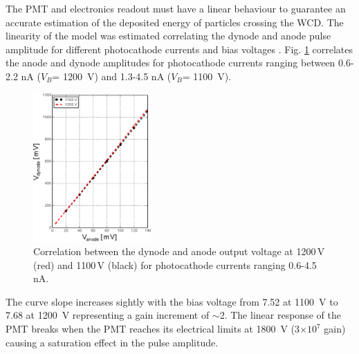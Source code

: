 \documentclass[letterpaper, 10 pt, conference]{ieeeconf}  %
\begin{document}


The PMT and electronics readout must have a linear behaviour to guarantee an accurate estimation of the deposited energy of particles crossing the WCD. The linearity of the model was estimated correlating the dynode and anode pulse amplitude for different photocathode currents and bias voltages \cite{Arnaldi2019}. Fig. \ref{Linear} correlates the anode and dynode amplitudes for photocathode currents ranging between 0.6-2.2 nA ($V_B$= 1200~V) and 1.3-4.5 nA ($V_B$= 1100~V).

\begin{figure}[h!]
\begin{center}
\includegraphics[width=0.4\textwidth]{Figures/Linear.eps}
\caption{Correlation between the dynode and anode output voltage at 1200\,V (red) and 1100\,V (black) for photocathode currents ranging 0.6-4.5 nA.}
\label{Linear}
\end{center}
\end{figure}

The curve slope increases sightly with the bias voltage from 7.52 at 1100~V to 7.68 at 1200~V representing a gain increment of $\sim$2. The linear response of the PMT breaks when the PMT reaches its electrical limits at 1800~V (3$\times10^7$ gain) causing a saturation effect in the pulse amplitude. 
\end{document}

